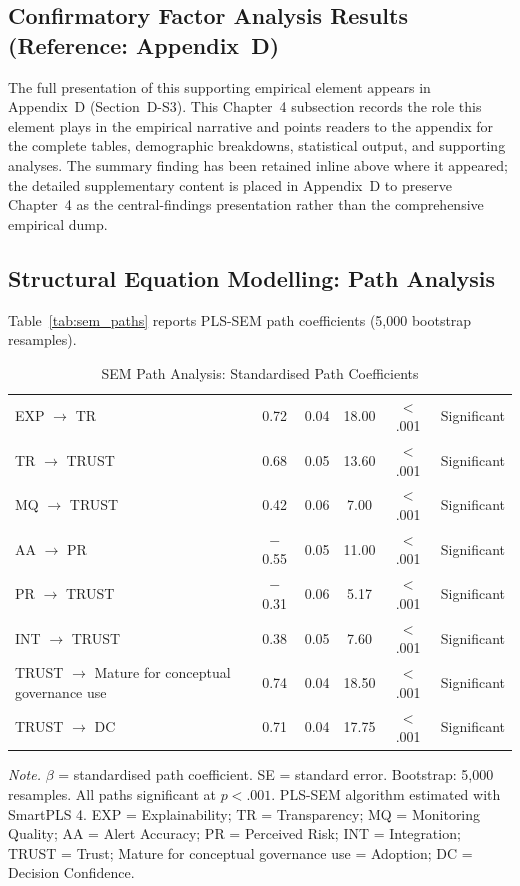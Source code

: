 \iffalse
\subsection{Confirmatory Factor Analysis Results (Reference: Appendix~D)}

\noindent The full presentation of this supporting empirical element appears in Appendix~D (Section~D-S3). This Chapter~4 subsection records the role this element plays in the empirical narrative and points readers to the appendix for the complete tables, demographic breakdowns, statistical output, and supporting analyses. The summary finding has been retained inline above where it appeared; the detailed supplementary content is placed in Appendix~D to preserve Chapter~4 as the central-findings presentation rather than the comprehensive empirical dump.

\subsection{Structural Equation Modelling: Path Analysis}

Table~\ref{tab:sem_paths} reports PLS-SEM path coefficients (5,000 bootstrap resamples).

\begin{table}[!htbp]
\tablestripes
\caption{SEM Path Analysis: Standardised Path Coefficients}
\tablefontsize
\begin{tabularx}{\textwidth}{@{} >{\raggedright\arraybackslash}p{3cm} C C C C L @{}}
\toprule
{} & \thead{$\beta$} &  &  &  &  \\
\midrule
EXP $\to$ TR & 0.72 & 0.04 & 18.00 & $<$.001 & Significant \\
TR $\to$ TRUST & 0.68 & 0.05 & 13.60 & $<$.001 & Significant \\
MQ $\to$ TRUST & 0.42 & 0.06 & 7.00 & $<$.001 & Significant \\
AA $\to$ PR & $-$0.55 & 0.05 & 11.00 & $<$.001 & Significant \\
PR $\to$ TRUST & $-$0.31 & 0.06 & 5.17 & $<$.001 & Significant \\
INT $\to$ TRUST & 0.38 & 0.05 & 7.60 & $<$.001 & Significant \\
TRUST $\to$ Mature for conceptual governance use & 0.74 & 0.04 & 18.50 & $<$.001 & Significant \\
TRUST $\to$ DC & 0.71 & 0.04 & 17.75 & $<$.001 & Significant \\
\bottomrule
\end{tabularx}
\vspace{0.5em}\noindent\textit{Note.} $\beta$ = standardised path coefficient. SE = standard error. Bootstrap: 5,000 resamples. All paths significant at $p < .001$. PLS-SEM algorithm estimated with SmartPLS 4. EXP = Explainability; TR = Transparency; MQ = Monitoring Quality; AA = Alert Accuracy; PR = Perceived Risk; INT = Integration; TRUST = Trust; Mature for conceptual governance use = Adoption; DC = Decision Confidence.
\end{table}

